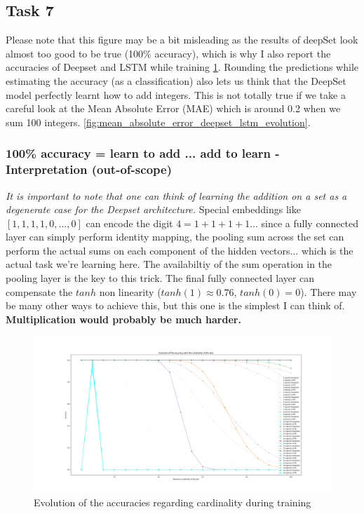 \documentclass[a4paper]{article}
\begin{document}
\subsection*{Task 7}
Please note that this figure may be a bit misleading  as the results of deepSet look almost too good to be true (100\% accuracy), which is why I also report the accuracies of Deepset and LSTM while training \ref{fig:performances_deepset_lstm_evolution}.
Rounding the predictions while estimating the accuracy (as a classification) also lets us think that the DeepSet model perfectly learnt how to add integers. This is not totally true if we take a careful look at the Mean Absolute Error (MAE) which is around 0.2 when we sum 100 integers. \ref{fig:mean_absolute_error_deepset_lstm_evolution}.

\subsubsection*{100\% accuracy = learn to add ... add to learn - Interpretation (out-of-scope)}
\textit{It is important to note that one can think of learning the addition on a set as a degenerate case for the Deepset architecture.}
\newline
Special embeddings like $[1, 1, 1, 1, 0, ..., 0]$ can encode the digit $4=1+1+1+1$...  since a fully connected layer can simply perform identity mapping, the pooling sum across the set can  perform the actual sums on each component of the hidden vectors... which is the actual task we're learning here. The availabiltiy of the sum operation in the pooling layer is the key to this trick. The final fully connected layer can compensate the $tanh$ non linearity ($tanh(1)\approx{0.76}$, $tanh(0)=0$). There may be many other ways to achieve this, but this one is the simplest I can think of.
\newline
\textbf{Multiplication would probably be much harder.}


\begin{figure}[h]
    \centering
    \includegraphics[width=1.\textwidth]{figures/deep_set_performances_evol.png}
    \caption{Evolution of the accuracies regarding cardinality during training}
    \label{fig:performances_deepset_lstm_evolution}
\end{figure}
\end{document}
